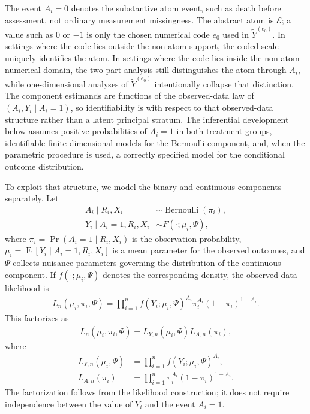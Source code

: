 \documentclass[11pt]{article}
\DeclareMathOperator*{\E}{E}
\DeclareMathOperator*{\Bernoulli}{Bernoulli}
\begin{document}
The event $A_i=0$ denotes the substantive atom event, such as death before assessment, not ordinary measurement missingness. The abstract atom is $\mathcal{E}$; a value such as $0$ or $-1$ is only the chosen numerical code $e_0$ used in $\widetilde{Y}^{(e_0)}$. In settings where the code lies outside the non-atom support, the coded scale uniquely identifies the atom. In settings where the code lies inside the non-atom numerical domain, the two-part analysis still distinguishes the atom through $A_i$, while one-dimensional analyses of $\widetilde{Y}^{(e_0)}$ intentionally collapse that distinction. The component estimands are functions of the observed-data law of $(A_i,Y_i\mid A_i=1)$, so identifiability is with respect to that observed-data structure rather than a latent principal stratum. The inferential development below assumes positive probabilities of $A_i = 1$ in both treatment groups, identifiable finite-dimensional models for the Bernoulli component, and, when the parametric procedure is used, a correctly specified model for the conditional outcome distribution.

To exploit that structure, we model the binary and continuous components separately. Let
\begin{align*}
  A_i \mid R_i, X_i &\sim \Bernoulli\left(\pi_i\right),\\
  Y_i \mid A_i = 1, R_i, X_i &\sim F\left(\cdot; \mu_i, \Psi\right),
\end{align*}
where $\pi_i = \Pr(A_i = 1 \mid R_i, X_i)$ is the observation probability, $\mu_i = \E[Y_i \mid A_i = 1, R_i, X_i]$ is a mean parameter for the observed outcomes, and $\Psi$ collects nuisance parameters governing the distribution of the continuous component. If $f(\cdot; \mu_i, \Psi)$ denotes the corresponding density, the observed-data likelihood is
\begin{align*}
  L_n(\mu_i, \pi_i, \Psi)
  = \prod_{i = 1}^n
    f\left(Y_i; \mu_i, \Psi\right)^{A_i}
    \pi_i^{A_i}
    \left(1 - \pi_i\right)^{1 - A_i}.
\end{align*}
This factorizes as
\begin{align*}
  L_n(\mu_i, \pi_i, \Psi)
  = L_{Y,n}(\mu_i, \Psi)L_{A,n}(\pi_i),
\end{align*}
where
\begin{align*}
  L_{Y,n}(\mu_i, \Psi)
  &= \prod_{i = 1}^n f\left(Y_i; \mu_i, \Psi\right)^{A_i},\\
  L_{A,n}(\pi_i)
  &= \prod_{i = 1}^n \pi_i^{A_i}\left(1 - \pi_i\right)^{1 - A_i}.
\end{align*}
The factorization follows from the likelihood construction; it does not require independence between the value of $Y_i$ and the event $A_i = 1$.
\end{document}
